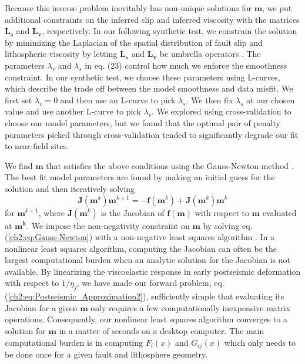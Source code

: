 Because this inverse problem inevitably has non-unique solutions for
$\mathbf{m}$, we put additional constraints on the inferred slip and
inferred viscosity with the matrices $\mathbf{L_s}$ and $\mathbf{L_v}$,
respectively.  In our following synthetic test, we constrain the
solution by minimizing the Laplacian of the spatial distribution of
fault slip and lithospheric viscosity by letting $\mathbf{L_s}$ and
$\mathbf{L_v}$ be umbrella operators \citep{Desbrun1999}.  The parameters
$\lambda_v$ and $\lambda_s$ in eq. (23) control how much we enforce
the smoothness constraint.  In our synthetic test, we choose these
parameters using L-curves, which describe the trade off between the
model smoothness and data misfit.  We first set $\lambda_v=0$ and then
use an L-curve to pick $\lambda_s$.  We then fix $\lambda_s$ at our
chosen value and use another L-curve to pick $\lambda_v$.  We explored
using cross-validation to choose our model parameters, but we found
that the optimal pair of penalty parameters picked through
cross-validation tended to significantly degrade our fit to near-field
sites.

We find $\mathbf{m}$ that satisfies the above conditions using the
Gauss-Newton method \citep[e.g.,][]{Aster2011}.  The best fit model
parameters are found by making an initial guess for the solution and
then iteratively solving
\begin{equation}\label{ch2:eq:Gauss-Newton}
\mathbf{J}(\mathbf{m}^{k})\mathbf{m}^{k+1} = 
-\mathbf{f}(\mathbf{m}^k) + 
\mathbf{J}(\mathbf{m}^{k})\mathbf{m}^{k}
\end{equation}
for $\mathbf{m}^{k+1}$, where $\mathbf{J}(\mathbf{m}^k)$ is the
Jacobian of $\mathbf{f(m)}$ with respect to $\mathbf{m}$ evaluated at
$\mathbf{m^k}$. We impose the non-negativity constraint on
$\mathbf{m}$ by solving eq. (\ref{ch2:eq:Gauss-Newton}) with a non-negative
least squares algorithm \citep{Lawson1995}. In a nonlinear least
squares algorithm, computing the Jacobian can often be the largest
computational burden when an analytic solution for the Jacobian is not
available. By linearizing the viscoelastic response in early
postseismic deformation with respect to $1/\eta_j$, we have made our
forward problem, eq. (\ref{ch2:eq:Postseismic_Approximation2}), sufficiently
simple that evaluating its Jacobian for a given $\mathbf{m}$ only
requires a few computationally inexpensive matrix operations.
Consequently, our nonlinear least squares algorithm converges to a
solution for $\mathbf{m}$ in a matter of seconds on a desktop
computer.  The main computational burden is in computing $F_i(x)$ and
$G_{ij}(x)$ which only needs to be done once for a given fault and
lithosphere geometry.

